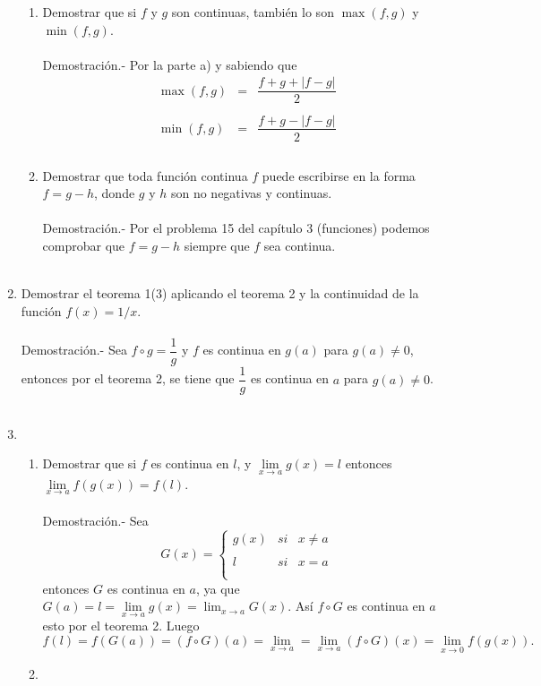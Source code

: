 \begin{enumerate}
\begin{enumerate}[\bfseries (a)]
    \item Demostrar que si $f$ y $g$ son continuas, también lo son $\max(f,g)$ y $\min(f,g)$.\\\\
	Demostración.-\; Por la parte a) y sabiendo que 
	$$\begin{array}{rcl}
	    \max(f,g)&=&\dfrac{f+g+|f-g|}{2}\\\\
	    \min(f,g)&=&\dfrac{f+g-|f-g|}{2}\\\\
	    \end{array}$$

    \item Demostrar que toda función continua $f$ puede escribirse en la forma $f=g-h$, donde $g$ y $h$ son no negativas y continuas.\\\\
	Demostración.-\; Por el problema 15 del capítulo 3 (funciones) podemos comprobar que $f=g-h$ siempre que $f$ sea continua.\\\\ 

\end{enumerate}

\item Demostrar el teorema 1(3) aplicando el teorema 2 y la continuidad de la función $f(x)=1/x$.\\\\
    Demostración.-\; Sea $f\circ g = \dfrac{1}{g}$ y $f$ es continua en $g(a)$ para $g(a)\neq 0$, entonces por el teorema 2, se tiene que $\dfrac{1}{g}$ es continua en $a$ para $g(a)\neq 0$.\\\\

\item 
    \begin{enumerate}[\bfseries (a)]

	\item Demostrar que si $f$ es continua en $l$, y $\lim\limits_{x\to a} g(x) = l$ entonces $\lim\limits_{x\to a}f(g(x)) = f(l)$.\\\\
	    Demostración.-\; Sea 
	    $$G(x) = \left\{\begin{array}{rcl}
		    g(x)&si&x\neq a\\\\
			l&si&x=a\\\\
	    \end{array}\right.$$
	    entonces $G$ es continua en $a$, ya que $G(a)=l=\lim\limits_{x\to a} g(x) = \lim_{x\to a} G(x)$. Así $f\circ G$ es continua en $a$ esto por el teorema 2. Luego 
	    $$f(l)=f(G(a))=(f\circ G)(a) = \lim\limits_{x\to a} = \lim\limits_{x\to a}(f\circ G)(x) = \lim\limits_{x\to 0} f(g(x)).$$

	\item 

    \end{enumerate}

\end{enumerate}
